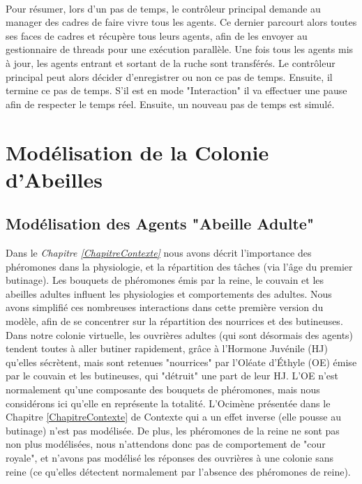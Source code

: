 			\paragraph{}			
			Pour résumer, lors d'un pas de temps, le contrôleur principal demande au manager des cadres de faire vivre tous les agents. Ce dernier parcourt alors toutes ses faces de cadres et récupère tous leurs agents, afin de les envoyer au gestionnaire de threads pour une exécution parallèle. Une fois tous les agents mis à jour, les agents entrant et sortant de la ruche sont transférés. Le contrôleur principal peut alors décider d'enregistrer ou non ce pas de temps. Ensuite, il termine ce pas de temps. S'il est en mode "Interaction" il va effectuer une pause afin de respecter le temps réel. Ensuite, un nouveau pas de temps est simulé.
			
	\section{Modélisation de la Colonie d'Abeilles}
	\label{sectionModelColonie}
		\subsection{Modélisation des Agents "Abeille Adulte"}
		
		Dans le \textit{Chapitre \ref{ChapitreContexte}} nous avons décrit l'importance des phéromones dans la physiologie, et la répartition des tâches (via l'âge du premier butinage). Les bouquets de phéromones émis par la reine, le couvain et les abeilles adultes influent les physiologies et comportements des adultes. Nous avons simplifié ces nombreuses interactions dans cette première version du modèle, afin de se concentrer sur la répartition des nourrices et des butineuses. Dans notre colonie virtuelle, les ouvrières adultes (qui sont désormais des agents) tendent toutes à aller butiner rapidement, grâce à l'Hormone Juvénile (HJ) qu'elles sécrètent, mais sont retenues "nourrices" par l'Oléate d'Éthyle (OE) émise par le couvain et les butineuses, qui "détruit" une part de leur HJ. L'OE n'est normalement qu'une composante des bouquets de phéromones, mais nous considérons ici qu'elle en représente la totalité. L'Ocimène présentée dans le Chapitre \ref{ChapitreContexte} de Contexte qui a un effet inverse (elle pousse au butinage) n'est pas modélisée. De plus, les phéromones de la reine ne sont pas non plus modélisées, nous n'attendons donc pas de comportement de "cour royale", et n'avons pas modélisé les réponses des ouvrières à une colonie sans reine (ce qu'elles détectent normalement par l'absence des phéromones de reine).
		
